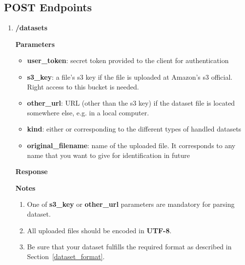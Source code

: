 \documentclass[a4paper,10pt]{scrartcl}
\begin{document}
\subsection{POST Endpoints}
\begin{enumerate}
 \item \textbf{/datasets}
\textbf{Parameters}
\begin{itemize}
\item \textbf{user\_token}: secret token provided to the client for authentication 
\item \textbf{s3\_key}: a file's s3 key if the file is uploaded at Amazon's s3 official. Right access to this bucket 
is needed.
\item \textbf{other\_url}: URL (other than the s3 key) if the dataset file is located somewhere else, e.g. in a local computer.
\item \textbf{kind}: either  or  corresponding to the different types of handled datasets
\item \textbf{original\_filename}: name of the uploaded file. It corresponds to any name that you want to give for identification
in future
\end{itemize}
\textbf{Response}
\textbf{Notes}
\begin{enumerate}
 \item One of \textbf{s3\_key} or \textbf{other\_url} parameters are mandatory for parsing dataset. 
 \item All uploaded files should be encoded in \textbf{UTF-8}.
 \item Be sure that your dataset fulfills the required format as described in Section~\ref{dataset_format}.
\end{enumerate}
  

\end{enumerate}
\end{document}
